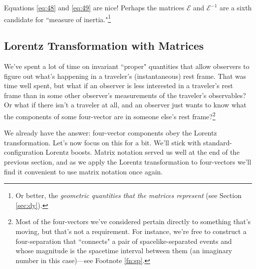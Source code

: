 \documentclass[12pt]{article}
\begin{document}
Equations \ref{eq:48} and \ref{eq:49} are nice! Perhaps the matrices $\mathcal{E}$ and $\mathcal{E}^{-1}$ are a sixth candidate for ``measure of inertia."\footnote{Or better, the \emph{geometric quantities that the matrices represent} (see Section \ref{sec:dy}).}



\subsection{Lorentz Transformation with Matrices}

We've spent a lot of time on invariant ``proper" quantities that allow observers to figure out what's happening in a traveler's (instantaneous) rest frame. That was time well spent, but what if an observer is less interested in a traveler's rest frame than in some other observer's measurements of the traveler's observables? Or what if there isn't a traveler at all, and an observer just wants to know what the components of some four-vector are in someone else's rest frame?\footnote{Most of the four-vectors we've considered pertain directly to something that's moving, but that's not a requirement. For instance, we're free to construct a four-separation that ``connects" a pair of spacelike-separated events and whose magnitude is the spacetime interval between them (an imaginary number in this case)---see Footnote \ref{fn:sp}.}

We already have the answer: four-vector components obey the Lorentz transformation. Let's now focus on this for a bit. We'll stick with standard-configuration Lorentz boosts. Matrix notation served us well at the end of the previous section, and as we apply the Lorentz transformation to four-vectors we'll find it convenient to use matrix notation once again.
\end{document}
